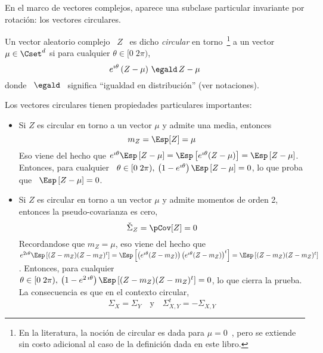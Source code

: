 En el  marco de vectores  complejos, aparece una subclase  particular invariante
por rotaci\'on: los vectores circulares.
%
\begin{definicion}\label{Def:MP:VectorAleatorioComplejoCircular}
%
  Un  vector   aleatorio  complejo   \  $Z$  \   es  dicho  {\em   circular}  en
  torno~\footnote{En la literatura, la noci\'on  de circular es dada para $\mu =
    0$~\cite[Def.~24.3.2]{Lap17}, pero  se extiende sin costo  adicional al caso
    de la  definici\'on dada en este libro.}   a un vector $\mu  \in \Cset^d$ si
  para cualquier $\theta \in [0 \; 2 \pi)$,
  \[
  e^{\imath \theta} \left( Z - \mu \right) \, \egald \, Z - \mu
  \]
  donde \ $\egald$ \ significa ``igualdad en distribuci\'on'' (ver notaciones).
\end{definicion}

Los vectores circulares tienen propiedades particulares importantes:
%
\begin{itemize}
\item  Si $Z$  es circular  en torno a  un vector  $\mu$ y  admite una  media,
  entonces
  \[
  m_Z = \Esp[Z] = \mu
  \]
  Eso  viene del  hecho que  $e^{\imath  \theta} \Esp\left[  Z -  \mu \right]  =
  \Esp\left[  e^{\imath  \theta}  (Z  -  \mu)  \right]  =  \Esp\left[  Z  -  \mu
  \right]$. Entonces,  para cualquier \ $\theta \in  [0 \; 2 \pi),  \: \left(1 -
    e^{\imath \theta} \right) \Esp\left[ Z -  \mu \right] = 0$, lo que proba que
  \ $\Esp\left[ Z - \mu \right] = 0$.
%
\item Si $Z$ es circular en torno a un vector $\mu$ y admite momentos de orden
  2, entonces la pseudo-covarianza es  cero,
  \[
  \check{\Sigma}_Z = \pCov[Z] = 0
  \]
  Recordandose que $m_Z = \mu$, eso  viene del hecho que $e^{2 \imath \theta}
  \Esp\left[ (Z - m_Z) (Z - m_Z)^t \right] = \Esp\left[ \left( e^{\imath \theta}
      (Z - m_Z)  \right) \left( e^{\imath \theta} (Z -  m_Z) \right)^t \right] =
  \Esp\left[ (Z - m_Z) (Z - m_Z)^t \right]$.  Entonces, para cualquier \ $\theta
  \in [0 \; 2 \pi), \: \left(1  - e^{2 \, \imath \theta} \right) \Esp\left[ (Z -
    m_Z) (Z - m_Z)^t  \right] = 0$, lo que cierra la  prueba. La consecuencia es
  que en el contexto circular,
  \[
  \Sigma_X = \Sigma_Y \quad \mbox{y} \quad \Sigma_{X,Y}^t = - \Sigma_{X,Y}
  \]
\end{itemize}

